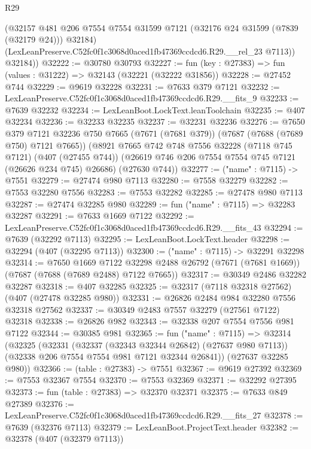 \begin{lexlean}{R29}
\begin{coremodule}
          (@32157
            @481
            @206
            @7554
            @7554
            @31599
            @7121
            (@32176 @24 @31599 (@7839 (@32179 @24)))
            @32184)
          (LexLeanPreserve.C52fc0f1c3068d0aced1fb47369ccdcd6.R29.__rel_23 @7113))
        @32184))
@32222 := @30780 @30793
@32227 := fun (key : @27383) => fun (values : @31222) => @32143 (@32221 (@32222 @31856))
@32228 := @27452 @744
@32229 := @9619 @32228
@32231 := @7633 @379 @7121
@32232 := LexLeanPreserve.C52fc0f1c3068d0aced1fb47369ccdcd6.R29.__fits_9
@32233 := @7639 @32232
@32234 := LexLeanBoot.LockText.leanToolchain
@32235 := @407 @32234
@32236 := @32233 @32235
@32237 := @32231 @32236
@32276 := @7650
    @379
    @7121
    @32236
    @750
    @7665
    (@7671 (@7681 @379))
    (@7687 (@7688 (@7689 @750) @7121 @7665))
    (@8921
      @7665
      @742
      @748
      @7556
      @32228
      (@7118 @745 @7121)
      (@407 (@27455 @744))
      (@26619 @746 @206 @7554 @7554 @745 @7121 (@26626 @234 @745) @26686)
      (@27630 @744))
@32277 := ("name" : @7115) -> @7551
@32279 := @27474 @980 @7113
@32280 := @7558 @32279
@32282 := @7553 @32280 @7556
@32283 := @7553 @32282
@32285 := @27478 @980 @7113
@32287 := @27474 @32285 @980
@32289 := fun ("name" : @7115) => @32283 @32287
@32291 := @7633 @1669 @7122
@32292 := LexLeanPreserve.C52fc0f1c3068d0aced1fb47369ccdcd6.R29.__fits_43
@32294 := @7639 (@32292 @7113)
@32295 := LexLeanBoot.LockText.header
@32298 := @32294 (@407 (@32295 @7113))
@32300 := ("name" : @7115) -> @32291 @32298
@32314 := @7650
    @1669
    @7122
    @32298
    @2488
    @26792
    (@7671 (@7681 @1669))
    (@7687 (@7688 (@7689 @2488) @7122 @7665))
@32317 := @30349 @2486 @32282 @32287
@32318 := @407 @32285
@32325 := @32317 (@7118 @32318 @27562) (@407 (@27478 @32285 @980))
@32331 := @26826 @2484 @984 @32280 @7556 @32318 @27562
@32337 := @30349 @2483 @7557 @32279 (@27561 @7122) @32318
@32338 := @26826 @982
@32343 := @32338 @207 @7554 @7556 @981 @7122
@32344 := @30385 @981
@32365 := fun ("name" : @7115) =>
  @32314
    (@32325
      (@32331
        (@32337 (@32343 @32344 @26842) (@27637 @980 @7113))
        (@32338 @206 @7554 @7554 @981 @7121 @32344 @26841))
      (@27637 @32285 @980))
@32366 := (table : @27383) -> @7551
@32367 := @9619 @27392
@32369 := @7553 @32367 @7554
@32370 := @7553 @32369
@32371 := @32292 @27395
@32373 := fun (table : @27383) => @32370 @32371
@32375 := @7633 @849 @27389
@32376 := LexLeanPreserve.C52fc0f1c3068d0aced1fb47369ccdcd6.R29.__fits_27
@32378 := @7639 (@32376 @7113)
@32379 := LexLeanBoot.ProjectText.header
@32382 := @32378 (@407 (@32379 @7113))

\end{coremodule}
\end{lexlean}
